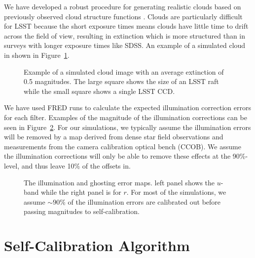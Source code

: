\documentclass[12pt,preprint]{aastex}
\begin{document}
We have developed a robust procedure for generating realistic clouds based on previously observed cloud structure functions \citep{Ivezic2007,Burke2010}. Clouds are particularly difficult for LSST because the short exposure times means clouds have little time to drift across the field of view, resulting in extinction which is more structured than in surveys with longer exposure times like SDSS.  An example of a simulated cloud in shown in Figure~\ref{fig:cloud}.  

\begin{figure}
\caption{Example of a simulated cloud image with an average extinction of 0.5 magnitudes.  The large square shows the size of an LSST raft while the small square shows a single LSST CCD.  \label{fig:cloud}}
\end{figure}

We have used FRED runs to calculate the expected illumination correction errors for each filter.  Examples of the magnitude of the illumination corrections can be seen in Figure~\ref{fig:illum}.  For our simulations, we typically assume the illumination errors will be removed by a map derived from dense star field observations and measurements from the camera calibration optical bench (CCOB).  We assume the illumination corrections will only be able to remove these effects at the 90\%-level, and thus leave 10\% of the offsets in.  

\begin{figure}
\caption{The illumination and ghosting error maps.  left panel shows
the $u$-band while the right panel is for $r$. For most of the simulations, we assume $\sim90$\% of the illumination errors are calibrated out before passing magnitudes to self-calibration.  \label{fig:illum}}
\end{figure}


\section{Self-Calibration Algorithm}\label{alg}
\end{document}
